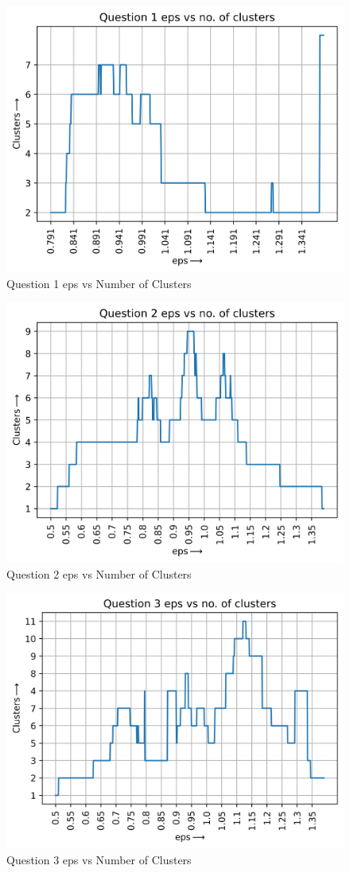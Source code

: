 \begin{figure}[H]
    \centering
    \includegraphics[width=0.75\linewidth]{IMAGE/eps&clusters.png}
    \caption{Question 1 eps vs Number of Clusters}
    \label{fig21}
\end{figure}

\begin{figure}[H]
    \centering
    \includegraphics[width=0.75\linewidth]{IMAGE/q2_eps&clusters.png}
    \caption{Question 2 eps vs Number of Clusters}
    \label{fig22}
\end{figure}

\begin{figure}[H]
    \centering
    \includegraphics[width=0.75\linewidth]{IMAGE/q3_eps&clusters.png}
    \caption{Question 3 eps vs Number of Clusters}
    \label{fig23}
\end{figure}

